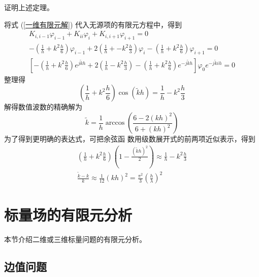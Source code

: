 \begin{exercise}
    证明上述定理。
\end{exercise}

\begin{solution}
    将式 (\ref{一维有限元解}) 代入无源项的有限元方程中，得到
    \begin{gather*}
        K_{i,i-1}\varphi_{i-1}+K_{ii}\varphi_i+K_{i,i+1}\varphi_{i+1}
        =0\\
        -\left(\frac{1}{h}+k^2\frac{h}{6}\right)
        \varphi_{i-1}
        +2\left(\frac{1}{h}+-k^2\frac{h}{3}\right)
        \varphi_i
        -\left(\frac{1}{h}+k^2\frac{h}{6}\right)
        \varphi_{i+1}
        =0\\
        \left[
            -\left(\frac{1}{h}+k^2\frac{h}{6}\right)
            e^{j\tilde{k}h}
            +2\left(\frac{1}{h}-k^2\frac{h}{3}\right)
            -\left(\frac{1}{h}+k^2\frac{h}{6}\right)
            e^{-j\tilde{k}h}
        \right]\varphi_0e^{-j\tilde{k}ih}
        =0
    \end{gather*}
    整理得
    \begin{equation*}
        \left(
            \frac{1}{h}+k^2\frac{h}{6}
        \right)\cos(\tilde{k}h)
        =\frac{1}{h}-k^2\frac{h}{3}
    \end{equation*}
    解得数值波数的精确解为
    \begin{equation*}
        \tilde{k}=\frac{1}{h}
        \arccos\left(
            \frac{6-2(kh)^2}{6+(kh)^2}
        \right)
    \end{equation*}
    为了得到更明确的表达式，可把余弦函
    数用级数展开式的前两项近似表示，得到
    \begin{gather*}
        \left(
            \frac{1}{h}+k^2\frac{h}{6}
        \right)\left(
            1-\frac{(\tilde{k}h)^2}{2}
        \right)
        \approx\frac{1}{h}-k^2\frac{h}{3}\\
        \frac{\tilde{k}-k}{k}
        \approx\frac{1}{12}(kh)^2
        =\frac{\pi^2}{3}\left(\frac{h}{\lambda}\right)^2
    \end{gather*}
\end{solution}

\section{标量场的有限元分析}

\par 本节介绍二维或三维标量问题的有限元分析。

\subsection{边值问题}

